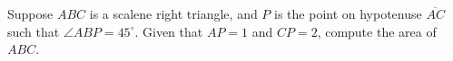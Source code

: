 Suppose $ABC$ is a scalene right triangle, and $P$ is the point on hypotenuse $\overline{AC}$ such that $\angle{ABP}=45^\circ$. Given that $AP=1$ and $CP=2$, compute the area of $ABC$.